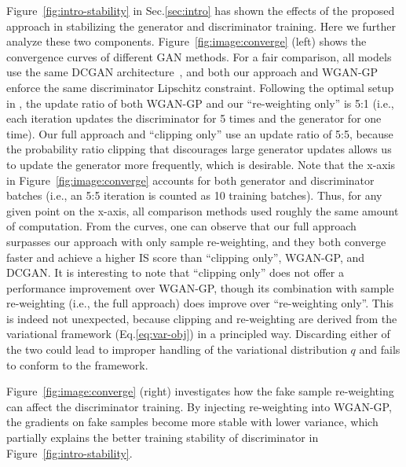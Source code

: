 \documentclass{article}
\newcommand{\0}{\bm{0}}
\begin{document}
Figure~\ref{fig:intro-stability} in Sec.\ref{sec:intro} has shown the effects of the proposed approach in stabilizing the generator and discriminator training. Here we further analyze these two components. Figure~\ref{fig:image:converge} (left) shows the convergence curves of different GAN methods. For a fair comparison, all models use the same DCGAN architecture~\cite{DCGAN}, and both our approach and WGAN-GP~\cite{wgangp} enforce the same discriminator Lipschitz constraint. Following the optimal setup in \citep{wgangp}, the update ratio of both WGAN-GP and our ``re-weighting only'' is 5:1 (i.e., each iteration updates the discriminator for 5 times and the generator for one time). Our full approach and ``clipping only'' use an update ratio of 5:5, because the probability ratio clipping that discourages large generator updates allows us to update the generator more frequently, which is desirable. Note that the x-axis in Figure~\ref{fig:image:converge} accounts for both generator and discriminator batches (i.e., an 5:5 iteration is counted as 10 training batches). Thus, for any given point on the x-axis, all comparison methods used roughly the same amount of computation.
From the curves, one can observe that our full approach surpasses our approach with only sample re-weighting, and they both converge faster and achieve a higher IS score than ``clipping only'', WGAN-GP, and DCGAN. It is interesting to note that ``clipping only'' does not offer a performance improvement over WGAN-GP, though its combination with sample re-weighting (i.e., the full approach) does improve over ``re-weighting only''. This is indeed not unexpected, because clipping and re-weighting are derived from the variational framework (Eq.\ref{eq:var-obj}) in a principled way. Discarding either of the two could lead to improper handling of the variational distribution $q$ and fails to conform to the framework. 

Figure~\ref{fig:image:converge} (right) investigates how the fake sample re-weighting can affect the discriminator training. By injecting re-weighting into WGAN-GP, the gradients on fake samples become more stable with lower variance, which partially explains the better training stability of discriminator in Figure~\ref{fig:intro-stability}.







 
\end{document}
